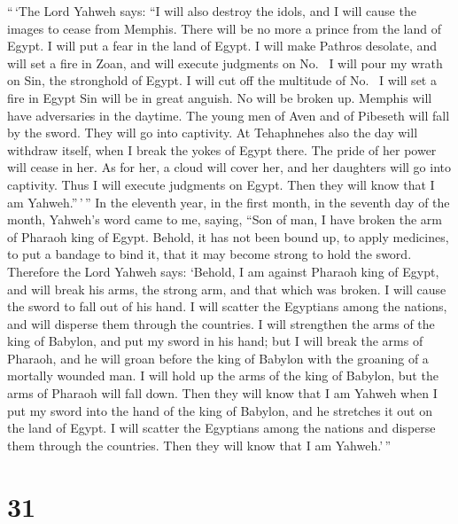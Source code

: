  ``\,`The Lord Yahweh says: ``I will also destroy the
idols, and I will cause the images to cease from Memphis. There will be
no more a prince from the land of Egypt. I will put a fear in the land
of Egypt.  I will make Pathros desolate, and will set a
fire in Zoan, and will execute judgments on No.~ I will
pour my wrath on Sin, the stronghold of Egypt. I will cut off the
multitude of No.~ I will set a fire in Egypt Sin will be
in great anguish. No will be broken up. Memphis will have adversaries in
the daytime.  The young men of Aven and of Pibeseth will
fall by the sword. They will go into captivity.  At
Tehaphnehes also the day will withdraw itself, when I break the yokes of
Egypt there. The pride of her power will cease in her. As for her, a
cloud will cover her, and her daughters will go into captivity.
 Thus I will execute judgments on Egypt. Then they will
know that I am Yahweh.''\,'\,''  In the eleventh year, in
the first month, in the seventh day of the month, Yahweh's word came to
me, saying,  ``Son of man, I have broken the arm of
Pharaoh king of Egypt. Behold, it has not been bound up, to apply
medicines, to put a bandage to bind it, that it may become strong to
hold the sword.  Therefore the Lord Yahweh says: `Behold,
I am against Pharaoh king of Egypt, and will break his arms, the strong
arm, and that which was broken. I will cause the sword to fall out of
his hand.  I will scatter the Egyptians among the
nations, and will disperse them through the countries.  I
will strengthen the arms of the king of Babylon, and put my sword in his
hand; but I will break the arms of Pharaoh, and he will groan before the
king of Babylon with the groaning of a mortally wounded man.
 I will hold up the arms of the king of Babylon, but the
arms of Pharaoh will fall down. Then they will know that I am Yahweh
when I put my sword into the hand of the king of Babylon, and he
stretches it out on the land of Egypt.  I will scatter
the Egyptians among the nations and disperse them through the countries.
Then they will know that I am Yahweh.'\,''

\hypertarget{section-29}{%
\section{31}\label{section-29}}

